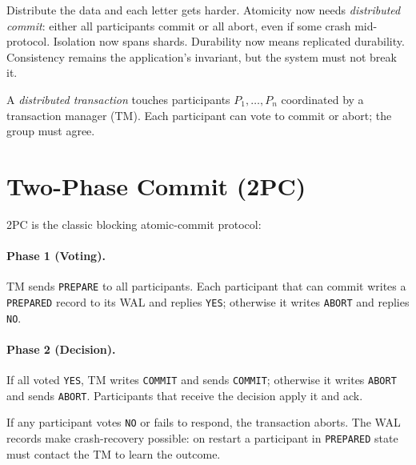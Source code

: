 Distribute the data and each letter gets harder. Atomicity now needs \emph{distributed commit}: either all participants commit or all abort, even if some crash mid-protocol. Isolation now spans shards. Durability now means replicated durability. Consistency remains the application's invariant, but the system must not break it.

A \emph{distributed transaction} touches participants $P_1,\dots,P_n$ coordinated by a transaction manager (TM). Each participant can vote to commit or abort; the group must agree.

\section{Two-Phase Commit (2PC)}
\label{sec:2pc}
2PC is the classic blocking atomic-commit protocol:

\paragraph{Phase 1 (Voting).} TM sends \texttt{PREPARE} to all participants. Each participant that can commit writes a \texttt{PREPARED} record to its WAL and replies \texttt{YES}; otherwise it writes \texttt{ABORT} and replies \texttt{NO}.

\paragraph{Phase 2 (Decision).} If all voted \texttt{YES}, TM writes \texttt{COMMIT} and sends \texttt{COMMIT}; otherwise it writes \texttt{ABORT} and sends \texttt{ABORT}. Participants that receive the decision apply it and ack.

If any participant votes \texttt{NO} or fails to respond, the transaction aborts. The WAL records make crash-recovery possible: on restart a participant in \texttt{PREPARED} state must contact the TM to learn the outcome.


